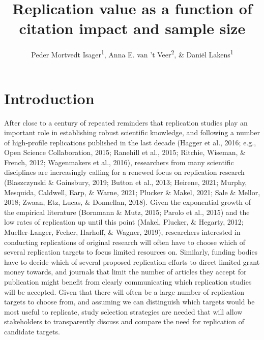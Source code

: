 \documentclass[
  english,
  jou,floatsintext]{apa6}
\title{Replication value as a function of citation impact and sample size}
\author{Peder Mortvedt Isager\textsuperscript{1}, Anna E. van 't Veer\textsuperscript{2}, \& Daniël Lakens\textsuperscript{1}}
\date{}
\affiliation{\vspace{0.5cm}\textsuperscript{1} Department of Industrial Engineering \& Innovation Sciences, Eindhoven University of Technology\\\textsuperscript{2} Methodology and Statistics unit, Institute of Psychology, Leiden University}
\begin{document}
\maketitle

\hypertarget{introduction}{%
\section{Introduction}\label{introduction}}

After close to a century of repeated reminders that replication studies play an important role in establishing robust scientific knowledge, and following a number of high-profile replications published in the last decade (Hagger et al., 2016; e.g., Open Science Collaboration, 2015; Ranehill et al., 2015; Ritchie, Wiseman, \& French, 2012; Wagenmakers et al., 2016), researchers from many scientific disciplines are increasingly calling for a renewed focus on replication research (Blaszczynski \& Gainsbury, 2019; Button et al., 2013; Heirene, 2021; Murphy, Mesquida, Caldwell, Earp, \& Warne, 2021; Plucker \& Makel, 2021; Sale \& Mellor, 2018; Zwaan, Etz, Lucas, \& Donnellan, 2018). Given the exponential growth of the empirical literature (Bornmann \& Mutz, 2015; Parolo et al., 2015) and the low rates of replication up until this point (Makel, Plucker, \& Hegarty, 2012; Mueller-Langer, Fecher, Harhoff, \& Wagner, 2019), researchers interested in conducting replications of original research will often have to choose which of several replication targets to focus limited resources on. Similarly, funding bodies have to decide which of several proposed replication efforts to direct limited grant money towards, and journals that limit the number of articles they accept for publication might benefit from clearly communicating which replication studies will be accepted. Given that there will often be a large number of replication targets to choose from, and assuming we can distinguish which targets would be most useful to replicate, study selection strategies are needed that will allow stakeholders to transparently discuss and compare the need for replication of candidate targets.
\end{document}
